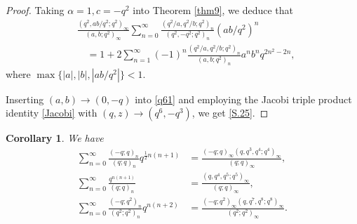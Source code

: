\documentclass[reqno,12pt]{amsart}
\newtheorem{corollary}[theorem]{Corollary}
\theoremstyle{remark}
\numberwithin{equation}{section}
\begin{document}
\begin{proof}
Taking $\alpha=1,c=-q^2$ into Theorem \ref{thm9}, we deduce that
\begin{align}
&\frac{\left(q^2,ab/q^2;q^2\right)_{\infty}}
{\left(a,b;q^2\right)_{\infty}}\sum_{n=0}^{\infty}
\frac{\left(q^2/a,q^2/b;q^2\right)_{n}}
{\left(q^2,-q^2;q^2\right)_n}\left(ab/q^2\right)^n\nonumber\\
&\quad=1+2\sum_{n=1}^{\infty}\left(-1\right)^n
\frac{\left(q^2/a,q^2/b;q^2\right)_{n}}{\left(a,b;q^2\right)_n}
a^nb^nq^{2n^2-2n},\label{q61}
\end{align}
where $\max\{|a|,|b|,|ab/q^2|\}<1$.

Inserting $\left(a,b\right)\to\left(0,-q\right)$ into \eqref{q61} and employing the Jacobi  triple product identity \eqref{Jacobi} with $\left(q,z\right)\to\left(q^6,-q^3\right)$, we get \eqref{S.25}.
\end{proof}
\begin{corollary}
We have
\begin{align}
\sum_{n=0}^{\infty}\frac{\left(-q;q\right)_n
}{\left(q;q\right)_n}q^{\frac{1}{2}n\left(n+1\right)}
&=
\frac{\left(-q;q\right)_{\infty}\left(q,q^3,q^4;q^4\right)_{\infty}}
{\left(q;q\right)_{\infty}},\tag{S.8}\label{S.8}\\
\sum_{n=0}^{\infty}\frac{q^{n\left(n+1\right)}}
{\left(q;q\right)_n}
&=\frac{\left(q,q^4,q^5;q^5\right)_{\infty}}
{\left(q;q\right)_{\infty}},\tag{S.14}\label{S.14}\\
\sum_{n=0}^{\infty}\frac{\left(-q;q^2\right)_n}
{\left(q^2;q^2\right)_n}q^{n\left(n+2\right)}
&=\frac{\left(-q;q^2\right)_{\infty}\left(q,q^7,q^8;q^8\right)_{\infty}}
{\left(q^2;q^2\right)_{\infty}}.\tag{S.34} \label{S.34}
\end{align}
\end{corollary}
\end{document}
